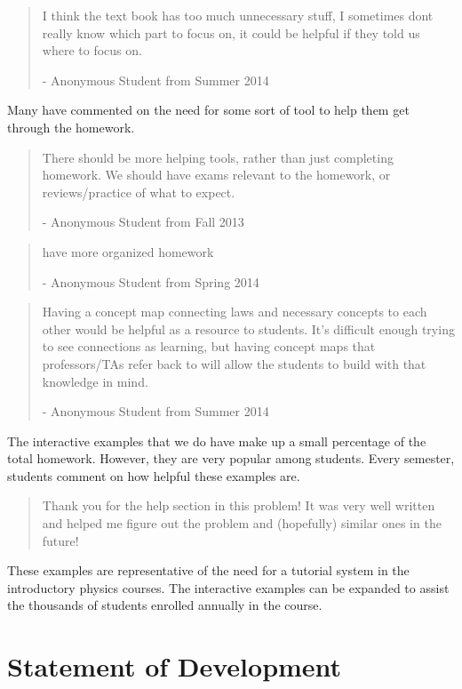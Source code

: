 \begin{quote}
I think the text book has too much unnecessary stuff, I sometimes dont really know which part to focus on, it could be helpful if they told us where to focus on.

- Anonymous Student from Summer 2014
\end{quote}

Many have commented on the need for some sort of tool to help them get through the homework.

\begin{quote}
There should be more helping tools, rather than just completing homework. We should have exams relevant to the homework, or reviews/practice of what to expect.

- Anonymous Student from Fall 2013
\end{quote}

\begin{quote}
have more organized homework

- Anonymous Student from Spring 2014
\end{quote}

\begin{quote}
Having a concept map connecting laws and necessary concepts to each other would be helpful as a resource to students. It's difficult enough trying to see connections as learning, but having concept maps that professors/TAs refer back to will allow the students to build with that knowledge in mind.

- Anonymous Student from Summer 2014
\end{quote}

The interactive examples that we do have make up a small percentage of the total homework. However, they are very popular among students. Every semester, students comment on how helpful these examples are.

\begin{quote}
Thank you for the help section in this problem! It was very well written and helped me figure out the problem and (hopefully) similar ones in the future!
\end{quote}

These examples are representative of the need for a tutorial system in the introductory physics courses. The interactive examples can be expanded to assist the thousands of students enrolled annually in the course.

\section{Statement of Development}

